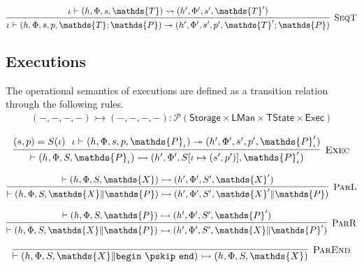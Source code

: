 \[
\infer[\textsc{SeqT}]
{
	\iota \vdash (h, \Phi, s, p, \mathds{T}; \mathds{P})
	\twoheadrightarrow
	(h', \Phi', s', p', \mathds{T}'; \mathds{P})
}
{
	\iota \vdash (h, \Phi, s, \mathds{T})
	\rightsquigarrow
	(h', \Phi', s', \mathds{T}')
}
\]

\subsection{Executions}

The operational semantics of executions are defined as a transition relation through the following rules.
\begin{gather*}
(-, -, -, -) \rightarrowtail (-, -, -, -) 
: \mathcal{P}(\mathsf{Storage} \times \mathsf{LMan} \times \mathsf{TState} \times \mathsf{Exec})
\end{gather*}

\[
\infer[\textsc{Exec}]
{
	\vdash (h, \Phi, S, \mathds{P}_\iota)
	\rightarrowtail
	(h', \Phi', S[\iota \mapsto (s', p')], \mathds{P}_\iota')
}
{
	(s, p) = S(\iota)\ \
	\iota \vdash (h, \Phi, s, p, \mathds{P}_\iota)
	\twoheadrightarrow
	(h', \Phi', s', p', \mathds{P}_\iota')
}
\]

\[
\infer[\textsc{ParL}]
{
	\vdash (h, \Phi, S, \mathds{X} \| \mathds{P})
	\rightarrowtail
	(h', \Phi', S', \mathds{X}' \| \mathds{P})
}
{
	\vdash (h, \Phi, S, \mathds{X})
	\rightarrowtail
	(h', \Phi', S', \mathds{X}')
}
\]

\[
\infer[\textsc{ParR}]
{
	\vdash (h, \Phi, S, \mathds{X} \| \mathds{P})
	\rightarrowtail
	(h', \Phi', S', \mathds{X} \| \mathds{P}')
}
{
	\vdash (h, \Phi, S, \mathds{P})
	\rightarrowtail
	(h', \Phi', S', \mathds{P}')
}
\]

\[
\infer[\textsc{ParEnd}]
{
	\vdash (h, \Phi, S, \mathds{X} \| \mathtt{begin}\ \pskip\ \mathtt{end})
	\rightarrowtail
	(h, \Phi, S, \mathds{X})
}
{}
\]